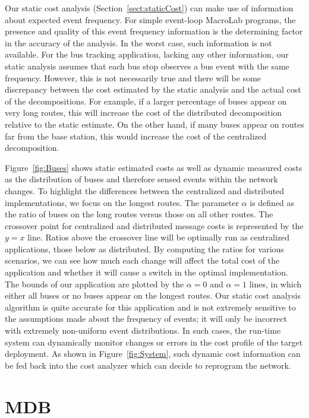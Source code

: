 Our static cost analysis (Section~\ref{sect:staticCost}) can make
use of information about expected event frequency. For simple event-loop
MacroLab programs, the presence and quality of this event frequency
information is the determining factor in the accuracy of the analysis.
In the worst case, such information is not available. For the bus
tracking application, lacking any other information, our static analysis
assumes that each bus stop observes a bus event with the same frequency.
However, this is not necessarily true and there will be some
discrepancy between the cost estimated by the static analysis and the
actual cost of the decompositions. For example, if a larger percentage
of buses appear on very long routes, this will increase the cost of the
distributed decomposition relative to the static estimate. On the other
hand, if many buses appear on routes far from the base
station, this would increase the cost of the centralized decomposition.

Figure~\ref{fig:Buses} shows static estimated costs as well as dynamic
measured costs as the distribution of buses and therefore sensed events
within the network changes.  To highlight the differences between the
centralized and distributed implementations, we focus on the longest
routes. The parameter $\alpha$ is defined as the ratio of buses on the
long routes versus those on all other routes.  The crossover
point for centralized and distributed message costs is represented by
the $y=x$ line.  Ratios above the crossover line will be optimally run
as centralized applications, those below as distributed.  By
computing the ratios for various scenarios, we can see how much each
change will affect the total cost of the application and whether it will
cause a switch in the optimal implementation.  The bounds of our application
are plotted by the $\alpha = 0$ and $\alpha = 1$ lines, in which either
all buses or no buses appear on the longest routes. Our static cost
analysis algorithm is quite accurate for this application and is not
extremely sensitive to the assumptions made about the frequency of
events; it will only be incorrect with extremely non-uniform event
distributions.  In such cases, the run-time system can dynamically
monitor changes or errors in the cost profile of the target deployment.
As shown in Figure~\ref{fig:System}, such dynamic cost information can
be fed back into the cost analyzer which can decide to reprogram the
network.


\section{MDB} \label{mdbEvaluation}

